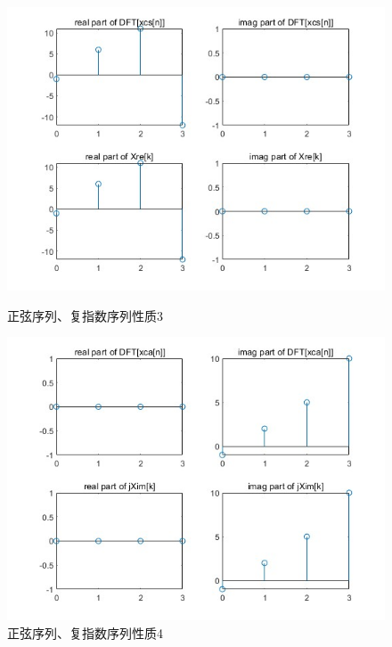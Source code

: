 \documentclass[a4paper,12pt]{article}
\begin{document}
\begin{figure}[h]
    \centering
    \begin{minipage}[b]{0.48\textwidth}
        \centering
        \includegraphics[width=\linewidth]{images/2_Verify/symmetry5.jpg}
        \caption{正弦序列、复指数序列性质3}
    \end{minipage}
    \hfill
    \begin{minipage}[b]{0.48\textwidth}
        \centering
        \includegraphics[width=\linewidth]{images/2_Verify/symmetry6.jpg}
        \caption{正弦序列、复指数序列性质4}
    \end{minipage}
\end{figure}


\newpage
\end{document}
